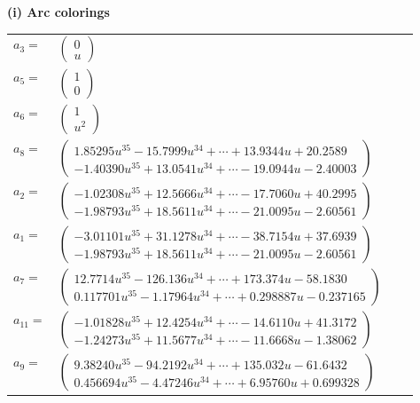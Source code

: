 \documentclass[1p]{elsarticle_modified}
\theoremstyle{definition}
\begin{document}
\flushleft \textbf{(i) Arc colorings}\\
\begin{tabular}{m{7pt} m{180pt} m{7pt} m{180pt} }
\flushright $a_{3}=$&$\begin{pmatrix}0\\u\end{pmatrix}$ \\
\flushright $a_{5}=$&$\begin{pmatrix}1\\0\end{pmatrix}$ \\
\flushright $a_{6}=$&$\begin{pmatrix}1\\u^2\end{pmatrix}$ \\
\flushright $a_{8}=$&$\begin{pmatrix}1.85295 u^{35}-15.7999 u^{34}+\cdots+13.9344 u+20.2589\\-1.40390 u^{35}+13.0541 u^{34}+\cdots-19.0944 u-2.40003\end{pmatrix}$ \\
\flushright $a_{2}=$&$\begin{pmatrix}-1.02308 u^{35}+12.5666 u^{34}+\cdots-17.7060 u+40.2995\\-1.98793 u^{35}+18.5611 u^{34}+\cdots-21.0095 u-2.60561\end{pmatrix}$ \\
\flushright $a_{1}=$&$\begin{pmatrix}-3.01101 u^{35}+31.1278 u^{34}+\cdots-38.7154 u+37.6939\\-1.98793 u^{35}+18.5611 u^{34}+\cdots-21.0095 u-2.60561\end{pmatrix}$ \\
\flushright $a_{7}=$&$\begin{pmatrix}12.7714 u^{35}-126.136 u^{34}+\cdots+173.374 u-58.1830\\0.117701 u^{35}-1.17964 u^{34}+\cdots+0.298887 u-0.237165\end{pmatrix}$ \\
\flushright $a_{11}=$&$\begin{pmatrix}-1.01828 u^{35}+12.4254 u^{34}+\cdots-14.6110 u+41.3172\\-1.24273 u^{35}+11.5677 u^{34}+\cdots-11.6668 u-1.38062\end{pmatrix}$ \\
\flushright $a_{9}=$&$\begin{pmatrix}9.38240 u^{35}-94.2192 u^{34}+\cdots+135.032 u-61.6432\\0.456694 u^{35}-4.47246 u^{34}+\cdots+6.95760 u+0.699328\end{pmatrix}$ \\

\end{tabular}
\end{document}
